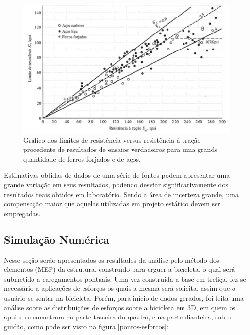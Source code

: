 \begin{figure}[h]
\centering
\includegraphics[scale=0.6]{figuras/resistencia_tracao.png}
\caption{Gráfico dos limites de resistência versus resistência à tração procedente de resultados de ensaios verdadeiros para uma grande quantidade de ferros forjados e de aços.}
\label{grafico-limites}
\end{figure}

Estimativas obtidas de dados de uma série de fontes podem apresentar uma grande variação em seus resultados, podendo desviar significativamente dos resultados reais obtidos em laboratório. Sendo a área de incerteza grande, uma compensação maior que aquelas utilizadas em projeto estático devem ser empregadas.

\subsection{Simulação Numérica}

Nesse seção serão apresentados os resultados da análise pelo método dos elementos (MEF) da estrutura, construido para erguer a bicicleta, o qual será submetido a caregamentos pontuais.
Uma vez construída a base em treliça, fez-se necessário a aplicações de esforços os quais a mesma será solicita, assim que o usuário se sentar na bicicleta. Porém, para início de dados gerados, foi feita uma análise sobre as distribuições de esforços sobre a bicicleta em 3D, em quem os apoios se encontram na parte traseira do quadro, e na parte dianteira, sob o guidão, como pode ser visto na figura \ref{pontos-esforcos}:

